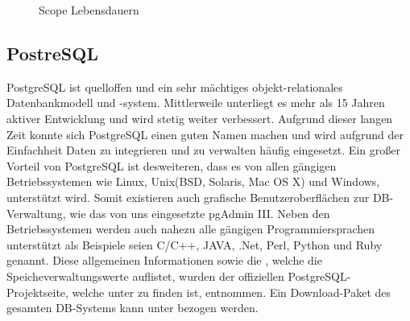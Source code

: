 \documentclass[12pt, twoside, a4paper, ngerman]{article}
\begin{document}
\begin{figure}
\centering{}
\caption[\textbf{Scope Labensdauern}]{Scope Lebensdauern}
\label{fig:ScopeLfTme}
\end{figure}

\newpage

\subsection{PostreSQL}

PostgreSQL ist quelloffen und ein sehr mächtiges objekt-relationales Datenbankmodell und -system. Mittlerweile unterliegt es mehr als 15 Jahren aktiver Entwicklung und wird stetig weiter verbessert. Aufgrund dieser langen Zeit konnte sich PostgreSQL einen guten Namen machen und wird aufgrund der Einfachheit Daten zu integrieren und zu verwalten häufig eingesetzt.
Ein großer Vorteil von PostgreSQL ist desweiteren, dass es von allen gängigen Betriebssystemen wie Linux, Unix(BSD, Solaris, Mac OS X) und Windows, unterstützt wird. Somit existieren auch grafische Benutzeroberflächen zur \ac{DB}-Verwaltung, wie das von uns eingesetzte \gls{pgAdmin III}.
Neben den Betriebssystemen werden auch nahezu alle gängigen Programmiersprachen unterstützt als Beispiele seien \gls{C/C++}, \gls{JAVA}, \gls{.Net}, \gls{Perl}, \gls{Python} und \gls{Ruby} genannt.
Diese allgemeinen Informationen sowie die , welche die Speicheverwaltungswerte auflistet, wurden der offiziellen PostgreSQL-Projektseite, welche unter \cite{PostgreSQLAllg} zu finden ist, entnommen. Ein Download-Paket des gesamten \ac{DB}-Systems kann unter \cite{PostgreSQLDwnld} bezogen werden. 
\end{document}
